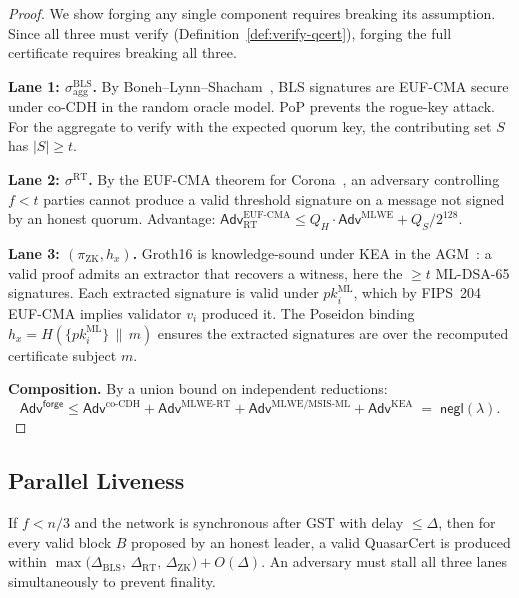 \begin{proof}
We show forging any single component requires breaking its assumption.
Since all three must verify (Definition~\ref{def:verify-qcert}), forging
the full certificate requires breaking all three.

\textbf{Lane 1: $\sigma^{\mathrm{BLS}}_{\mathrm{agg}}$.}
By Boneh--Lynn--Shacham~\cite{boneh2001short}, BLS signatures are
EUF-CMA secure under co-CDH in the random oracle model. PoP prevents
the rogue-key attack. For the aggregate to verify with the expected
quorum key, the contributing set $S$ has $|S| \geq t$.

\textbf{Lane 2: $\sigma^{\mathrm{RT}}$.}
By the EUF-CMA theorem for Corona~\cite{corona}, an adversary
controlling $f < t$ parties cannot produce a valid threshold signature
on a message not signed by an honest quorum. Advantage:
$\mathsf{Adv}^{\text{EUF-CMA}}_{\text{RT}} \leq Q_H \cdot
\mathsf{Adv}^{\text{MLWE}} + Q_S / 2^{128}$.

\textbf{Lane 3: $(\pi_{\mathrm{ZK}}, h_x)$.}
Groth16 is knowledge-sound under KEA in the AGM~\cite{groth2016}: a
valid proof admits an extractor that recovers a witness, here the
$\geq t$ ML-DSA-65 signatures. Each extracted signature is valid under
$\mathit{pk}_i^{\mathrm{ML}}$, which by FIPS~204 EUF-CMA implies
validator $v_i$ produced it. The Poseidon binding
$h_x = H(\{\mathit{pk}_i^{\mathrm{ML}}\} \,\|\, m)$ ensures the extracted
signatures are over the recomputed certificate subject $m$.

\textbf{Composition.}
By a union bound on independent reductions:
\[
\mathsf{Adv}^{\mathsf{forge}} \leq
\mathsf{Adv}^{\text{co-CDH}} +
\mathsf{Adv}^{\text{MLWE-RT}} +
\mathsf{Adv}^{\text{MLWE/MSIS-ML}} +
\mathsf{Adv}^{\text{KEA}} \;=\; \mathsf{negl}(\lambda).
\]
\end{proof}

\subsection{Parallel Liveness}

\begin{theorem}
\label{thm:par-liveness}
If $f < n/3$ and the network is synchronous after GST with delay $\leq
\Delta$, then for every valid block $B$ proposed by an honest leader, a
valid QuasarCert is produced within
$\max\bigl(\Delta_{\mathrm{BLS}},\, \Delta_{\mathrm{RT}},\,
\Delta_{\mathrm{ZK}}\bigr) + O(\Delta)$.
An adversary must stall all three lanes simultaneously to prevent
finality.
\end{theorem}

